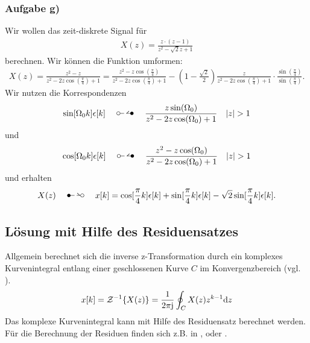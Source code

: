 \documentclass[11pt,a4paper,DIV=12]{scrartcl}
\begin{document}
\subsubsection{Aufgabe g)}
Wir wollen das zeit-diskrete Signal für
\begin{align}
	X(z)=\frac{z\cdot(z-1)}{z^2-\sqrt{2}z+1}
\end{align}
berechnen.
Wir können die Funktion umformen:
\begin{align}
	X(z)=\frac{z^2-z}{z^2-2z\cos(\frac{\pi}{4})+1}=\frac{z^2-z\cos(\frac{\pi}{4})}{z^2-2z\cos(\frac{\pi}{4})+1}-(1-\frac{\sqrt{2}}{2})\frac{z}{z^2-2z\cos(\frac{\pi}{4})+1}\cdot\frac{\sin(\frac{\pi}{4})}{\sin(\frac{\pi}{4})}.
\end{align}
Wir nutzen die Korrespondenzen
\begin{align}
	\sin[\Omega_0k]\epsilon[k]\quad\ztransf\quad\frac{z\sin(\Omega_0)}{z^2-2z\cos(\Omega_0)+1}\quad |z| > 1
\end{align}
und
\begin{align}
	\cos[\Omega_0k]\epsilon[k]\quad\ztransf\quad\frac{z^2-z\cos(\Omega_0)}{z^2-2z\cos(\Omega_0)+1}\quad |z| > 1
\end{align}
und erhalten
\begin{align}
	X(z)\quad\Ztransf\quad x[k]=\cos[\frac{\pi}{4}k]\epsilon[k]+\sin[\frac{\pi}{4}k]\epsilon[k]-\sqrt{2}\sin[\frac{\pi}{4}k]\epsilon[k].
\end{align}
\newpage
\subsection{Lösung mit Hilfe des Residuensatzes}
Allgemein berechnet sich die inverse z-Transformation durch ein komplexes Kurvenintegral entlang einer geschlossenen Kurve $C$ im Konvergenzbereich (vgl. \cite[S. 192]{UlrichWeber2017} ).
\begin{align}
	x[k]=\mathcal{Z}^{-1}\{X(z)\}=\frac{1}{2\pi\im}\oint_C X(z)z^{k-1}\mathrm{d}z
\end{align}
Das komplexe Kurvenintegral kann mit Hilfe des Residuensatz berechnet werden.\\
Für die Berechnung der Residuen finden sich z.B. in \cite[K. 14, S. 753-754]{Bronstein2015}, \cite[S. 37-38]{UlrichWeber2017} oder \cite[S. 137-138]{Fritzsche2019}.
\end{document}
